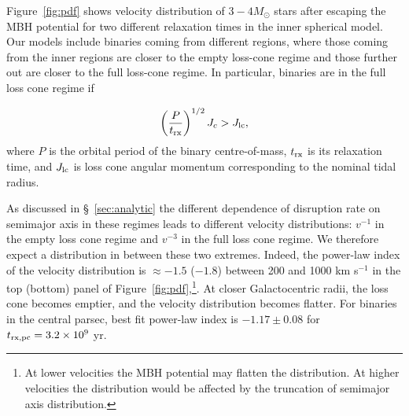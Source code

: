 \documentclass[fleqn,usenatbib]{mnras}
\begin{document}
Figure~\ref{fig:pdf} shows velocity distribution of $3-4 M_{\odot}$ stars after escaping the MBH potential for two different relaxation times in the inner spherical model.
 Our models include binaries coming from different regions, where those coming from the inner regions are closer to the empty loss-cone regime and those further out are closer to the full loss-cone regime. In particular, binaries are in the full loss cone regime if 
 
 \begin{equation}
    \left(\frac{P}{t_{\rm rx}}\right)^{1/2} J_c>J_{\rm lc},
\end{equation}
where $P$ is the orbital period of the binary centre-of-mass, $t_{\rm rx}$ is its relaxation time, and $J_{\rm lc}$ is loss cone angular momentum corresponding to the nominal tidal radius.
 
 As discussed in \S~\ref{sec:analytic} the different dependence of disruption rate on semimajor axis in these regimes leads to different velocity distributions: $v^{-1}$ in the empty loss cone regime and $v^{-3}$ in the full loss cone regime. We therefore expect a distribution in between these two extremes. Indeed, the power-law index of the velocity distribution is $\approx-1.5$ ($-1.8$) between 200 and 1000 km s$^{-1}$ in the top (bottom) panel of Figure~\ref{fig:pdf},\footnote{At lower velocities the MBH potential may flatten the distribution. At higher velocities the distribution would be affected by the truncation of semimajor axis distribution.}. At closer Galactocentric radii, the loss cone becomes emptier, and the velocity distribution becomes flatter. For binaries in the central parsec, best fit power-law index is $-1.17 \pm 0.08$ for $t_{\rm rx, pc}=3.2\times 10^9$ yr.
\end{document}
